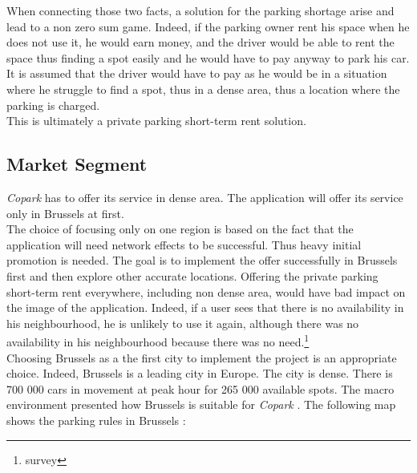 \documentclass[12pt,a4paper,oneside]{book}
\newcommand{\bp}{\textit{Copark }}
\begin{document}
When connecting those two facts, a solution for the parking shortage arise and lead to a non zero sum game. Indeed, if the parking owner rent his space when he does not use it, he would earn money, and the driver would be able to rent the space thus finding a spot easily and he would have to pay anyway to park his car. It is assumed that the driver would have to pay as he would be in a situation where he struggle to find a spot, thus in a dense area, thus a location where the parking is charged.\\

This is ultimately a private parking short-term rent solution.

\subsection{Market Segment}
\bp has to offer its service in dense area. The application will offer its service only in Brussels at first.\\

The choice of focusing only on one region is based on the fact that the application will need network effects to be successful. Thus heavy initial promotion is needed. The goal is to implement the offer successfully in Brussels first and then explore other accurate locations. Offering the private parking short-term rent everywhere, including non dense area, would have bad impact on the image of the application. Indeed, if a user sees that there is no availability in his neighbourhood, he is unlikely to use it again, although there was no availability in his neighbourhood because there was no need.\footnote{survey} \\

Choosing Brussels as a the first city to implement the project is an appropriate choice. Indeed, Brussels is a leading city in Europe. The city is dense. There is 700 000 cars in movement at peak hour for 265 000 available spots.\cite{parkbx} The macro environment presented how Brussels is suitable for \bp. The following map shows the parking rules in Brussels\cite{parkbx} : \\
\end{document}
